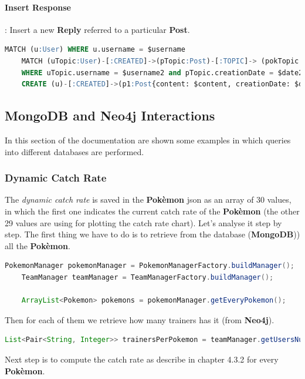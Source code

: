 \paragraph{Insert Response}: Insert a new \textbf{Reply} referred to a particular \textbf{Post}.
\begin{lstlisting}[language=SQL]
	MATCH (u:User) WHERE u.username = $username 
	MATCH (uTopic:User)-[:CREATED]->(pTopic:Post)-[:TOPIC]-> (pokTopic:Pokemon)
	WHERE uTopic.username = $username2 and pTopic.creationDate = $date2 and pTopic.content = $content2 and pokTopic.name = $name2
	CREATE (u)-[:CREATED]->(p1:Post{content: $content, creationDate: $date})-[:TOPIC]->(pTopic)
\end{lstlisting}



\subsection{MongoDB and Neo4j Interactions}
In this section of the documentation are shown some examples in which queries into different databases are performed.
\subsubsection{Dynamic Catch Rate}
The \textit{dynamic catch rate} is saved in the \textbf{Pokèmon} json as an array of 30 values, in which the first one indicates the current catch rate of the \textbf{Pokèmon} (the other 29 values are using for plotting the catch rate chart). Let’s analyse it step by step.
The first thing we have to do is to retrieve from the database (\textbf{MongoDB})) all the \textbf{Pokèmon}.


\begin{lstlisting}[language=Java]
	PokemonManager pokemonManager = PokemonManagerFactory.buildManager();
	TeamManager teamManager = TeamManagerFactory.buildManager();
	
	ArrayList<Pokemon> pokemons = pokemonManager.getEveryPokemon();
\end{lstlisting}

Then for each of them we retrieve how many trainers has it (from \textbf{Neo4j}).

\begin{lstlisting}[language=Java]
	List<Pair<String, Integer>> trainersPerPokemon = teamManager.getUsersNumberThatOwnsAPokemonNotFiltered();
\end{lstlisting}
Next step is to compute the catch rate as describe in chapter 4.3.2 for every \textbf{Pokèmon}.


